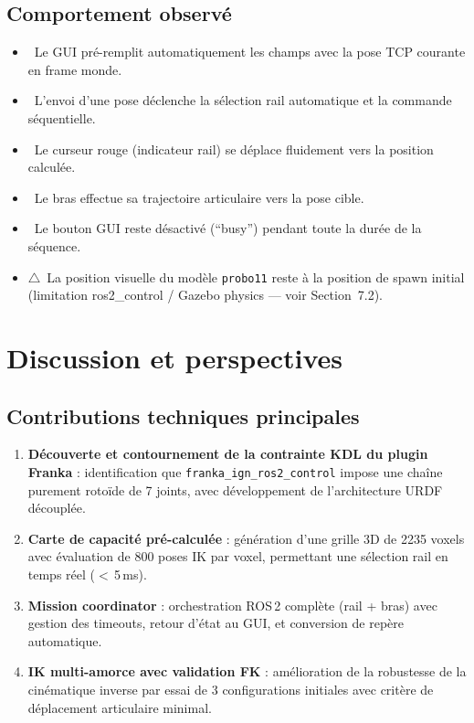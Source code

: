 \documentclass[11pt, a4paper]{article}
\begin{document}
\subsection{Comportement observé}

\begin{itemize}[leftmargin=1.5em, itemsep=4pt]
  \item \checkmark\ Le GUI pré-remplit automatiquement les champs avec la pose TCP courante en frame monde.
  \item \checkmark\ L'envoi d'une pose déclenche la sélection rail automatique et la commande séquentielle.
  \item \checkmark\ Le curseur rouge (indicateur rail) se déplace fluidement vers la position calculée.
  \item \checkmark\ Le bras effectue sa trajectoire articulaire vers la pose cible.
  \item \checkmark\ Le bouton GUI reste désactivé (``busy'') pendant toute la durée de la séquence.
  \item $\triangle$\ La position visuelle du modèle \texttt{probo11} reste à la position de spawn initial (limitation ros2\_control / Gazebo physics — voir Section~7.2).
\end{itemize}

\section{Discussion et perspectives}

\subsection{Contributions techniques principales}

\begin{enumerate}[leftmargin=2em, itemsep=6pt]
  \item \textbf{Découverte et contournement de la contrainte KDL du plugin Franka} : identification que \texttt{franka\_ign\_ros2\_control} impose une chaîne purement rotoïde de 7 joints, avec développement de l'architecture URDF découplée.

  \item \textbf{Carte de capacité pré-calculée} : génération d'une grille 3D de 2235 voxels avec évaluation de 800 poses IK par voxel, permettant une sélection rail en temps réel ($<$\,5\,ms).

  \item \textbf{Mission coordinator} : orchestration ROS\,2 complète (rail + bras) avec gestion des timeouts, retour d'état au GUI, et conversion de repère automatique.

  \item \textbf{IK multi-amorce avec validation FK} : amélioration de la robustesse de la cinématique inverse par essai de 3 configurations initiales avec critère de déplacement articulaire minimal.
\end{enumerate}
\end{document}
